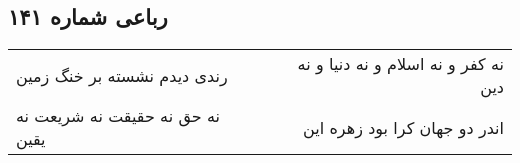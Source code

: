 \begin{center}
\section*{رباعی شماره ۱۴۱}
\label{sec:sh141}
\begin{longtable}{l p{0.5cm} r}
رندی دیدم نشسته بر خنگ زمین
&&
نه کفر و نه اسلام و نه دنیا و نه دین
\\
نه حق نه حقیقت نه شریعت نه یقین
&&
اندر دو جهان کرا بود زهره این
\\
\end{longtable}
\end{center}
